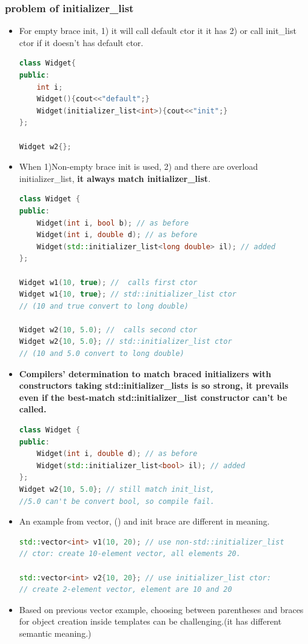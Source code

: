 \documentclass[a4paper,12pt,twoside]{book}
\begin{document}
	\subsubsection{problem of initializer\_list}
	
\begin{itemize}

\item For empty brace init, 1) it will call default ctor it it has 2) or call init\_list ctor if it doesn't has default ctor. 

\begin{lstlisting}[frame=single, language=c++,mathescape=true]
class Widget{
public:
	int i;
	Widget(){cout<<"default";}
	Widget(initializer_list<int>){cout<<"init";}
};

Widget w2{}; 
\end{lstlisting}

	\item When 1)Non-empty brace init is used, 2) and there are overload initializer\_list, \textbf{it always match initializer\_list}.
\begin{lstlisting}[frame=single, language=c++,mathescape=true]
class Widget {
public:
	Widget(int i, bool b); // as before
	Widget(int i, double d); // as before
	Widget(std::initializer_list<long double> il); // added
};
	
Widget w1(10, true); //  calls first ctor
Widget w1{10, true}; // std::initializer_list ctor
// (10 and true convert to long double)

Widget w2(10, 5.0); //  calls second ctor
Widget w2{10, 5.0}; // std::initializer_list ctor
// (10 and 5.0 convert to long double)
\end{lstlisting}
	
	\item \textbf{ Compilers' determination to match braced initializers with constructors taking std::initializer\_lists is so strong, it prevails even if the best-match std::initializer\_list constructor can't be called.}
\begin{lstlisting}[frame=single, language=c++,mathescape=true]
class Widget {
public:
	Widget(int i, double d); // as before
	Widget(std::initializer_list<bool> il); // added
};
Widget w2{10, 5.0}; // still match init_list,
//5.0 can't be convert bool, so compile fail.
\end{lstlisting}
	
	\item An example from vector, () and init brace are different in meaning.
\begin{lstlisting}[frame=single, language=c++,mathescape=true]
std::vector<int> v1(10, 20); // use non-std::initializer_list
// ctor: create 10-element vector, all elements 20.
	
std::vector<int> v2{10, 20}; // use initializer_list ctor:
// create 2-element vector, element are 10 and 20
\end{lstlisting}
	
	\item Based on previous vector example, choosing between parentheses and braces for object creation inside templates can be challenging.(it has different semantic meaning.)
\end{itemize}
\end{document}
